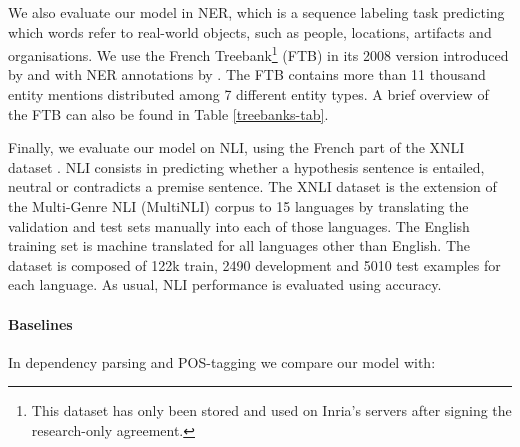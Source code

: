 \documentclass[11pt,a4paper]{article}
\begin{document}
We also evaluate our model in NER, which is a sequence labeling task predicting which words refer to real-world objects, such as people, locations, artifacts and organisations. We use the French Treebank\footnote{This dataset has only been stored and used on Inria's servers after signing the research-only agreement.} (FTB) \citep{abeille:03} in its 2008 version introduced by \citet{cc-clustering:09short} and with NER annotations by \citet{sagot2012annotation}. The FTB contains more than 11 thousand entity mentions distributed among 7 different entity types. A brief overview of the FTB can also be found in Table \ref{treebanks-tab}.

Finally, we evaluate our model on NLI, using the French part of the XNLI dataset \cite{conneau2018xnli}. NLI consists in predicting whether a hypothesis sentence is entailed, neutral or contradicts a premise sentence. The XNLI dataset is the extension of the Multi-Genre NLI (MultiNLI) corpus \cite{williams2018broad} to 15 languages by translating the validation and test sets manually into each of those languages.
The English training set is machine translated for all languages other than English.
The dataset is composed of 122k train, 2490 development and 5010 test examples for each language.
As usual, NLI performance is evaluated using accuracy.


\paragraph{Baselines}
In dependency parsing and POS-tagging we compare our model with:
\end{document}
